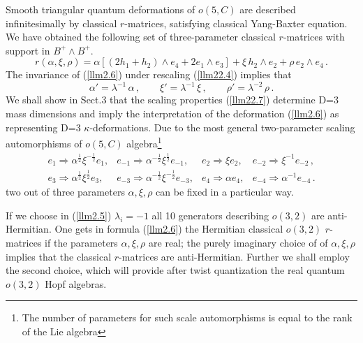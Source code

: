 \documentclass[a4paper,12pt,showkeys]{article}
\begin{document}
Smooth triangular quantum deformations of $o(5,C)$ are described
infinitesimally  by classical $r$-matrices, satisfying classical
Yang-Baxter equation.
 We have obtained the following set of three-parameter
  classical $r$-matrices with support in $B^+
\wedge B^+$.
\begin{equation}\label{llm2.6}
  r(\alpha,\xi, \rho) = \alpha [( 2h_1 + h_2 ) \wedge e_4 + 2e_1 \wedge
  e_3] +
  \xi \, h_2 \wedge e_2 + \rho \, e_2 \wedge e_4 \, .
\end{equation}
The invariance of (\ref{llm2.6}) under rescaling (\ref{llm22.4})
implies that
\begin{equation}\label{llm22.7}
  \alpha' = \lambda^{-1} \, \alpha \, , \qquad \xi'= \lambda^{-1}
  \, \xi \, , \qquad \rho'= \lambda^{-2} \, \rho \, .
\end{equation}
We shall show in Sect.3 that the scaling properties
(\ref{llm22.7})
 determine D=3 mass dimensions and
 imply the interpretation of the deformation
(\ref{llm2.6}) as representing D=3 $\kappa$-deformations.
Due to
the most general  two-parameter scaling
   automorphisms
    of $o(5,C)$ algebra\footnote{The number of parameters for
    such scale automorphisms is equal to the rank of the Lie algebra}
\begin{equation}
\begin{array}{cccc}
e_{1}\Rightarrow \alpha ^{\frac{1}{2}}\xi ^{-\frac{1}{2}}e_{1}, &
e_{-1}\Rightarrow \alpha ^{-\frac{1}{2}}\xi ^{\frac{1}{2}}e_{-1},
& e_{2}\Rightarrow \xi e_{2}, &
e_{-2} \Rightarrow \xi ^{-1}  e_{-2} \, ,%
\\
e_{3}\Rightarrow \alpha ^{\frac{1}{2}}\xi ^{\frac{1}{2}}e_{3}, &
e_{-3}\Rightarrow \alpha ^{-\frac{1}{2}}\xi ^{-\frac{1}{2}}e_{-3},
& e_{4}\Rightarrow \alpha e_{4}, & e_{-4}\Rightarrow \alpha
^{-1}e_{-4}\, .
\end{array}
\label{llm2.14}
\end{equation}%
  two out of
three parameters $\alpha , \xi, \rho$ can be fixed in a particular
way.


If we choose in (\ref{llm2.5}) $\lambda_i = -1$ all 10 generators
 describing $o(3,2)$ are anti-Hermitian. One gets
 in formula (\ref{llm2.6})
  the Hermitian classical $o(3,2)$ $r$-matrices
    if the parameters $\alpha, \xi, \rho $ are  real;
    the purely  imaginary choice of of $\alpha, \xi, \rho$ implies
    that the classical $r$-matrices are anti-Hermitian.
    Further we shall employ the second choice, which will provide
    after twist quantization the
    real quantum $o(3,2)$ Hopf algebras.
\end{document}
